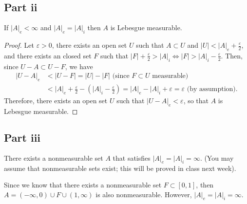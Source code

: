 \subsection{Part ii}

\begin{question}
    If $|A|_e<\infty$ and $|A|_e=|A|_i$ then $A$ is Lebesgue measurable.
\end{question}

\begin{answer}
    \begin{proof}
        Let $\varepsilon > 0$, there exists an open set $U$ such that $A \subset U$ and $\lvert U \rvert < \lvert A \rvert_e + \tfrac{\varepsilon}{2}$, and there exists an closed set $F$ such that $\lvert F \rvert + \tfrac{\varepsilon}{2}> \lvert A \rvert_i \Leftrightarrow \lvert F \rvert > \lvert A \rvert_i - \tfrac{\varepsilon}{2}$. Then, since $U - A \subset U - F$, we have
        \begin{equation}
            \begin{aligned}
                \lvert U - A \rvert_e &< \lvert U - F \rvert = \lvert U \rvert - \lvert F \rvert \text{ (since $F\subset U$ measurable)}\\
                &< \lvert A \rvert_e + \tfrac{\varepsilon}{2} - (\lvert A \rvert_i - \tfrac{\varepsilon}{2}) = \lvert A \rvert_e - \lvert A \rvert_i + \varepsilon = \varepsilon \text{ (by assumption)}.
            \end{aligned}
        \end{equation}
        Therefore, there exists an open set $U$ such that $\lvert U - A \rvert_e < \varepsilon$, so that $A$ is Lebesgue measurable.
    \end{proof}
\end{answer}

\subsection{Part iii}

\begin{question}
   There exists a nonmeasurable set $A$ that satisfies $|A|_e=|A|_i=\infty$. (You may assume that nonmeasurable sets exist; this will be proved in class next week).
\end{question}

\begin{answer}
    Since we know that there exists a nonmeasurable set $F \subset [0,1]$, then $A = (-\infty,0) \cup F \cup (1,\infty)$ is also nonmeasurable. However, $\lvert A \rvert_e = \lvert A \rvert_i = \infty$.
\end{answer}

